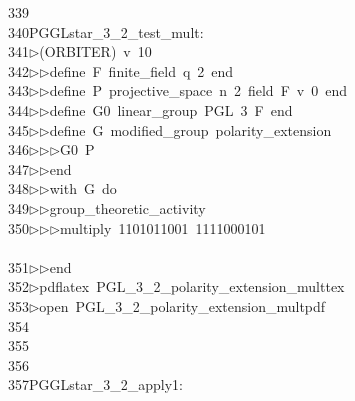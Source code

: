 \begin{tabbing}
339\>\\[0pt]
340\>PGGLstar\_3\_2\_test\_mult:\\[0pt]
341\>$\triangleright$\>(ORBITER)\ v\ 10\ \\[0pt]
342\>$\triangleright$\>$\triangleright$\>define\ F\ finite\_field\ q\ 2\ end\ \\[0pt]
343\>$\triangleright$\>$\triangleright$\>define\ P\ projective\_space\ n\ 2\ field\ F\ v\ 0\ end\ \\[0pt]
344\>$\triangleright$\>$\triangleright$\>define\ G0\ linear\_group\ PGL\ 3\ F\ end\ \\[0pt]
345\>$\triangleright$\>$\triangleright$\>define\ G\ modified\_group\ polarity\_extension\ \\[0pt]
346\>$\triangleright$\>$\triangleright$\>$\triangleright$\>G0\ P\ \\[0pt]
347\>$\triangleright$\>$\triangleright$\>end\ \\[0pt]
348\>$\triangleright$\>$\triangleright$\>with\ G\ do\ \\[0pt]
349\>$\triangleright$\>$\triangleright$\>group\_theoretic\_activity\ \\[0pt]
350\>$\triangleright$\>$\triangleright$\>$\triangleright$\>multiply\ 1101011001\ 1111000101\ \\[0pt]
\>\\[0pt]
351\>$\triangleright$\>$\triangleright$\>end\\[0pt]
352\>$\triangleright$\>pdflatex\ PGL\_3\_2\_polarity\_extension\_multtex\\[0pt]
353\>$\triangleright$\>open\ PGL\_3\_2\_polarity\_extension\_multpdf\\[0pt]
354\>\\[0pt]
355\>\\[0pt]
356\>\\[0pt]
357\>PGGLstar\_3\_2\_apply1:\\[0pt]

\end{tabbing}
